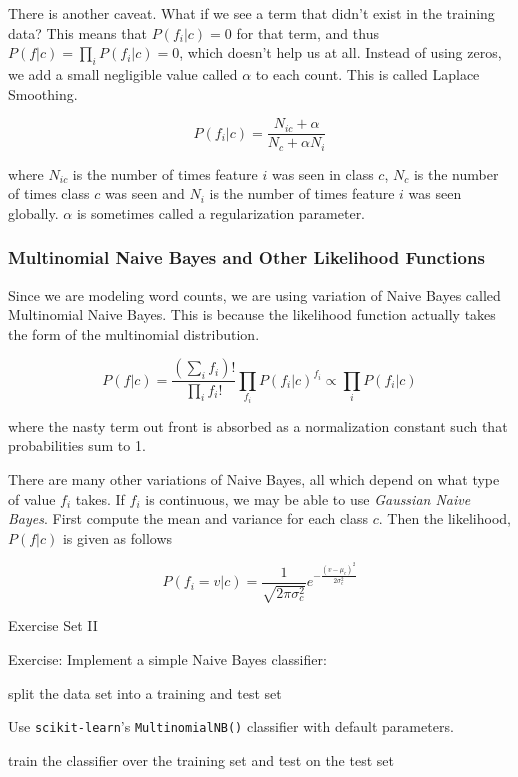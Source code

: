 \documentclass[11pt]{article}
\begin{document}
There is another caveat. What if we see a term that didn't exist in the
training data? This means that \(P(f_i \vert c) = 0\) for that term, and
thus \(P(f \vert c) = \prod_i P(f_i | c) = 0\), which doesn't help us at
all. Instead of using zeros, we add a small negligible value called
\(\alpha\) to each count. This is called Laplace Smoothing.

\[P(f_i \vert c) = \frac{N_{ic}+\alpha}{N_c + \alpha N_i}\]

where \(N_{ic}\) is the number of times feature \(i\) was seen in class
\(c\), \(N_c\) is the number of times class \(c\) was seen and \(N_i\)
is the number of times feature \(i\) was seen globally. \(\alpha\) is
sometimes called a regularization parameter.

    \subsubsection{Multinomial Naive Bayes and Other Likelihood
Functions}\label{multinomial-naive-bayes-and-other-likelihood-functions}

Since we are modeling word counts, we are using variation of Naive Bayes
called Multinomial Naive Bayes. This is because the likelihood function
actually takes the form of the multinomial distribution.

\[P(f \vert c) = \frac{\left( \sum_i f_i \right)!}{\prod_i f_i!} \prod_{f_i} P(f_i \vert c)^{f_i} \propto \prod_{i} P(f_i \vert c)\]

where the nasty term out front is absorbed as a normalization constant
such that probabilities sum to 1.

There are many other variations of Naive Bayes, all which depend on what
type of value \(f_i\) takes. If \(f_i\) is continuous, we may be able to
use \emph{Gaussian Naive Bayes}. First compute the mean and variance for
each class \(c\). Then the likelihood, \(P(f \vert c)\) is given as
follows

\[P(f_i = v \vert c) = \frac{1}{\sqrt{2\pi \sigma^2_c}} e^{- \frac{\left( v - \mu_c \right)^2}{2 \sigma^2_c}}\]

    Exercise Set II

Exercise: Implement a simple Naive Bayes classifier:

split the data set into a training and test set

Use \texttt{scikit-learn}'s \texttt{MultinomialNB()} classifier with
default parameters.

train the classifier over the training set and test on the test set
\end{document}
